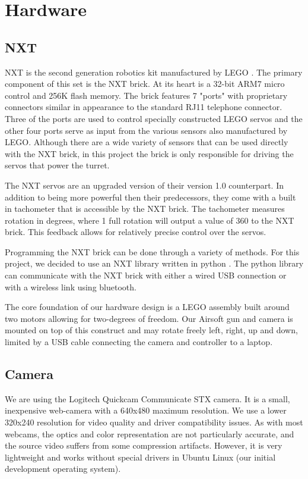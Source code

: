 \documentclass[10pt,twocolumn,letterpaper]{article}
\begin{document}
\section{Hardware}

\subsection{NXT}

NXT is the second generation robotics kit manufactured by LEGO \cite{nxt}. The primary component of this set is the NXT brick. At its heart is a 32-bit ARM7 micro control and 256K flash memory. The brick features 7 "ports" with proprietary connectors similar in appearance to the standard RJ11 telephone connector. Three of the ports are used to control specially constructed LEGO servos and the other four ports serve as input from the various sensors also manufactured by LEGO. Although there are a wide variety of sensors that can be used directly with the NXT brick, in this project the brick is only responsible for driving the servos that power the turret.

The NXT servos are an upgraded version of their version 1.0 counterpart. In addition to being more powerful then their predecessors, they come with a built in tachometer that is accessible by the NXT brick. The tachometer measures rotation in degrees, where 1 full rotation will output a value of 360 to the NXT brick. This feedback allows for relatively precise control over the servos.

Programming the NXT brick can be done through a variety of methods. For this project, we decided to use an NXT library written in python \cite{pynxt}. The python library can communicate with the NXT brick with either a wired USB connection or with a wireless link using bluetooth. 

The core foundation of our hardware design is a LEGO assembly built around two motors allowing for two-degrees of freedom. Our Airsoft gun and camera is mounted on top of this construct and may rotate freely left, right, up and down, limited by a USB cable connecting the camera and controller to a laptop.
 
\subsection{Camera}

We are using the Logitech Quickcam Communicate STX \cite{logi} camera.  It is a small, inexpensive web-camera with a 640x480 maximum resolution.  We use a lower 320x240 resolution for video quality and driver compatibility issues.  As with most webcams, the optics and color representation are not particularly accurate, and the source video suffers from some compression artifacts.  However, it is very lightweight and works without special drivers in Ubuntu Linux (our initial development operating system).
\end{document}
